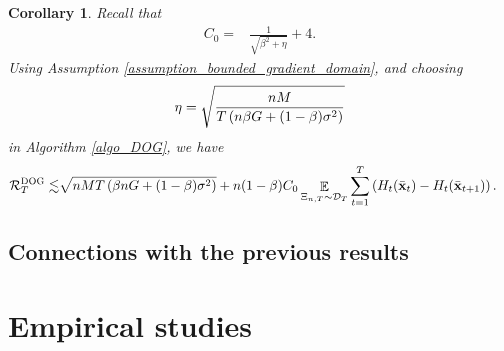 \documentclass{article}
\newtheorem{Corollary}{\bf{Corollary}}
\newtheorem{Assumption}{\bf{Assumption}}
\begin{document}
\begin{Corollary}
Recall that 
\begin{align}
\nonumber
C_0 = & \frac{1}{\sqrt{\beta^2 + \eta}} + 4.
\end{align}
Using Assumption \ref{assumption_bounded_gradient_domain}, and choosing 
\begin{align}
\nonumber
\eta = \sqrt{\frac{nM}{ T\left( n\beta G + (1-\beta)\sigma^2 \right) }}
\end{align} in Algorithm \ref{algo_DOG}, we have
\begin{align}
\nonumber
{\mathcal{R}}_T^{\textsc{DOG}} \lesssim & \sqrt{nMT\left( \beta nG + (1-\beta)\sigma^2 \right)} + n(1-\beta)C_0  \mathop{\mathbb{E}}_{ \Xi_{n,T} \sim \mathcal{D}_{T} } \sum_{t=1}^T  \left( H_t(\bar{{\bf x}}_t) - H_t(\bar{{\bf x}}_{t+1}) \right).
\end{align}

\end{Corollary}




\subsection{Connections with the previous results}










%















\section{Empirical studies}
\end{document}
